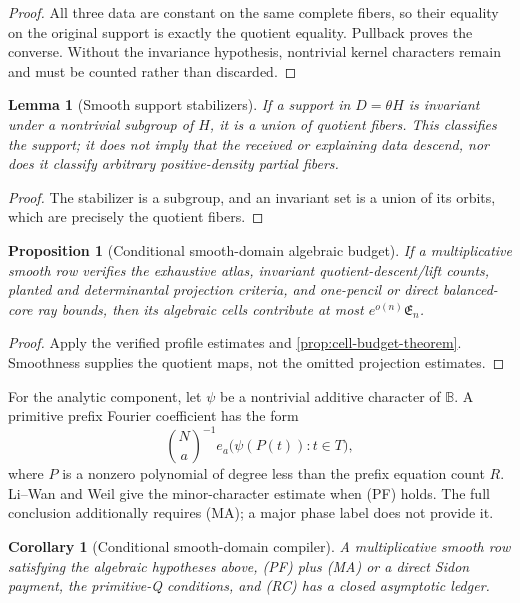 \documentclass[12pt,a4paper]{amsart}
\numberwithin{equation}{section}
\newtheorem{proposition}[proposition]{Proposition}
\newtheorem{lemma}[lemma]{Lemma}
\newtheorem{corollary}[corollary]{Corollary}
\theoremstyle{remark}
\newcommand{\B}{\mathbb B}
\begin{document}
\begin{proof}
All three data are constant on the same complete fibers, so their equality
on the original support is exactly the quotient equality.  Pullback proves
the converse.  Without the invariance hypothesis, nontrivial kernel
characters remain and must be counted rather than discarded.
\end{proof}

\begin{lemma}[Smooth support stabilizers]\label{lem:smooth-stabilizer-exhaustion}
If a support in \(D=\theta H\) is invariant under a nontrivial subgroup of
\(H\), it is a union of quotient fibers.  This classifies the support; it
does not imply that the received or explaining data descend, nor does it
classify arbitrary positive-density partial fibers.
\end{lemma}

\begin{proof}
The stabilizer is a subgroup, and an invariant set is a union of its
orbits, which are precisely the quotient fibers.
\end{proof}

\begin{proposition}[Conditional smooth-domain algebraic budget]\label{prop:smooth-domain-algebraic-closure}
If a multiplicative smooth row verifies the exhaustive atlas, invariant
quotient-descent/lift counts, planted and determinantal projection criteria, and
one-pencil or direct balanced-core ray bounds, then its algebraic cells
contribute at most \(e^{o(n)}\mathfrak E_n\).
\end{proposition}

\begin{proof}
Apply the verified profile estimates and
\cref{prop:cell-budget-theorem}.  Smoothness supplies the quotient maps,
not the omitted projection estimates.
\end{proof}

For the analytic component, let \(\psi\) be a nontrivial additive character of \(\B\).  A primitive prefix Fourier coefficient has the form
\[
       \binom Na^{-1}e_a\bigl(\psi(P(t)):t\in T\bigr),
\]
where \(P\) is a nonzero polynomial of degree less than the prefix
equation count \(R\).
Li--Wan and Weil give the minor-character estimate when \textup{(PF)}
holds.  The full conclusion additionally requires \textup{(MA)}; a major
phase label does not provide it.

\begin{corollary}[Conditional smooth-domain compiler]\label{cor:smooth-domain-full-ledger}
A multiplicative smooth row satisfying the algebraic hypotheses above,
\textup{(PF)} plus \textup{(MA)} or a direct Sidon payment, the primitive-Q
conditions, and \textup{(RC)} has a closed asymptotic ledger.
\end{corollary}
\end{document}
